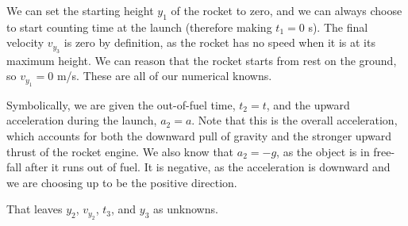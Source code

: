 {We can set the starting height $y_{1}$ of the rocket to zero, and we can always choose to start counting time at the launch (therefore making $t_{1}=0$ s). The final velocity $v_{y_{3}}$ is zero by definition, as the rocket has no speed when it is at its maximum height. We can reason that the rocket starts from rest on the ground, so $v_{y_{1}}=0$ m/s. These are all of our numerical knowns.

Symbolically, we are given the out-of-fuel time, $t_{2} = t$, and the upward acceleration during the launch, $a_{2}=a$. Note that this is the overall acceleration, which accounts for both the downward pull of gravity and the stronger upward thrust of the rocket engine. We also know that $a_{2}=-g$, as the object is in free-fall after it runs out of fuel. It is negative, as the acceleration is downward and we are choosing up to be the positive direction.

That leaves $y_{2}$, $v_{y_{2}}$, $t_{3}$, and $y_{3}$ as unknowns.
}
